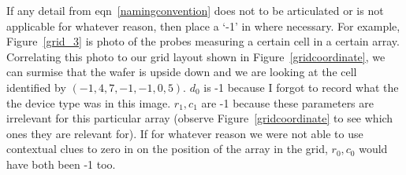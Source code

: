 \documentclass{article}
\begin{document}
          If any detail from eqn~\ref{namingconvention} does not to be articulated or is not applicable for whatever
          reason, then place a `-1' in where necessary. For example, Figure~\ref{grid_3} is photo of the probes
          measuring a certain cell in a certain array. Correlating this photo to our grid layout shown in
          Figure~\ref{gridcoordinate}, we can surmise that the wafer is upside down and we are looking at the cell
          identified by $(-1, 4, 7, -1, -1, 0, 5)$. $d_0$ is -1 because I forgot to record what the the device type was
          in this image. $r_1, c_1$ are -1 because these parameters are irrelevant for this particular array (observe
          Figure~\ref{gridcoordinate} to see which ones they are relevant for). If for whatever reason we were not able
          to use contextual clues to zero in on the position of the array in the grid, $r_0, c_0$ would have both been
          -1 too.
\end{document}
